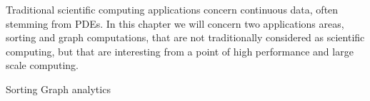 
Traditional scientific computing applications concern continuous data,
often stemming from \acp{PDE}. In this chapter we will concern two
applications areas, sorting and graph computations, that are not
traditionally considered as scientific computing, but that are
interesting from a point of high performance and large scale computing.

 {Sorting}
 {Graph analytics}
